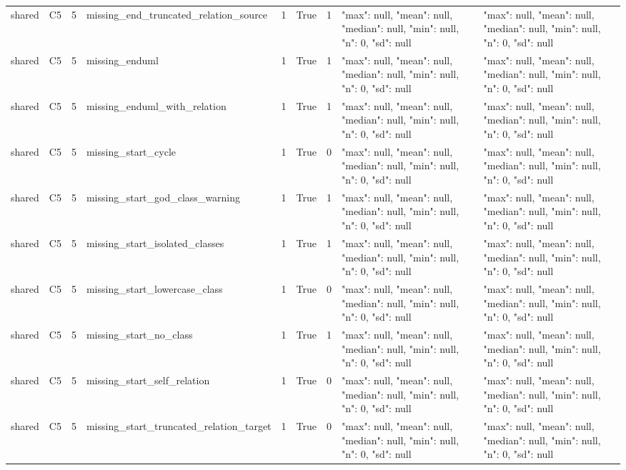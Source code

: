 \begin{tabular}{lllllllll}
shared & C5 & 5 & missing\_end\_truncated\_relation\_source & 1 & True & 1 & {"max": null, "mean": null, "median": null, "min": null, "n": 0, "sd": null} & {"max": null, "mean": null, "median": null, "min": null, "n": 0, "sd": null} \\
shared & C5 & 5 & missing\_enduml & 1 & True & 1 & {"max": null, "mean": null, "median": null, "min": null, "n": 0, "sd": null} & {"max": null, "mean": null, "median": null, "min": null, "n": 0, "sd": null} \\
shared & C5 & 5 & missing\_enduml\_with\_relation & 1 & True & 1 & {"max": null, "mean": null, "median": null, "min": null, "n": 0, "sd": null} & {"max": null, "mean": null, "median": null, "min": null, "n": 0, "sd": null} \\
shared & C5 & 5 & missing\_start\_cycle & 1 & True & 0 & {"max": null, "mean": null, "median": null, "min": null, "n": 0, "sd": null} & {"max": null, "mean": null, "median": null, "min": null, "n": 0, "sd": null} \\
shared & C5 & 5 & missing\_start\_god\_class\_warning & 1 & True & 1 & {"max": null, "mean": null, "median": null, "min": null, "n": 0, "sd": null} & {"max": null, "mean": null, "median": null, "min": null, "n": 0, "sd": null} \\
shared & C5 & 5 & missing\_start\_isolated\_classes & 1 & True & 1 & {"max": null, "mean": null, "median": null, "min": null, "n": 0, "sd": null} & {"max": null, "mean": null, "median": null, "min": null, "n": 0, "sd": null} \\
shared & C5 & 5 & missing\_start\_lowercase\_class & 1 & True & 0 & {"max": null, "mean": null, "median": null, "min": null, "n": 0, "sd": null} & {"max": null, "mean": null, "median": null, "min": null, "n": 0, "sd": null} \\
shared & C5 & 5 & missing\_start\_no\_class & 1 & True & 1 & {"max": null, "mean": null, "median": null, "min": null, "n": 0, "sd": null} & {"max": null, "mean": null, "median": null, "min": null, "n": 0, "sd": null} \\
shared & C5 & 5 & missing\_start\_self\_relation & 1 & True & 0 & {"max": null, "mean": null, "median": null, "min": null, "n": 0, "sd": null} & {"max": null, "mean": null, "median": null, "min": null, "n": 0, "sd": null} \\
shared & C5 & 5 & missing\_start\_truncated\_relation\_target & 1 & True & 0 & {"max": null, "mean": null, "median": null, "min": null, "n": 0, "sd": null} & {"max": null, "mean": null, "median": null, "min": null, "n": 0, "sd": null} \\

\end{tabular}
